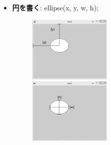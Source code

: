 \documentclass[11pt,a4paper]{jarticle}
\begin{document}
\begin{itemize}
 \item \textbf{円を書く}: ellipse(x, y, w, h);

\begin{figure}[htbp]
 \begin{minipage}{0.5\hsize}
  \begin{center}
   \includegraphics[width=40mm]{Processing_img1-6.eps}
  \end{center}
 \end{minipage}
 \begin{minipage}{0.5\hsize}
 \begin{center}
  \includegraphics[width=40mm]{Processing_img1-8.eps}
 \end{center}
 \end{minipage}
\end{figure}


\end{itemize}
\end{document}

